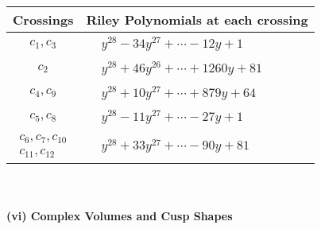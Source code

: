 \documentclass[1p]{elsarticle_modified}
\theoremstyle{definition}
\begin{document}
\begin{tabular}{m{50pt}|m{274pt}}
Crossings & \hspace{64pt}Riley Polynomials at each crossing \\
\hline $$\begin{aligned}c_{1},c_{3}\end{aligned}$$&$\begin{aligned}
&y^{28}-34 y^{27}+\cdots-12 y+1
\end{aligned}$\\
\hline $$\begin{aligned}c_{2}\end{aligned}$$&$\begin{aligned}
&y^{28}+46 y^{26}+\cdots+1260 y+81
\end{aligned}$\\
\hline $$\begin{aligned}c_{4},c_{9}\end{aligned}$$&$\begin{aligned}
&y^{28}+10 y^{27}+\cdots+879 y+64
\end{aligned}$\\
\hline $$\begin{aligned}c_{5},c_{8}\end{aligned}$$&$\begin{aligned}
&y^{28}-11 y^{27}+\cdots-27 y+1
\end{aligned}$\\
\hline $$\begin{aligned}c_{6},c_{7},c_{10}\\c_{11},c_{12}\end{aligned}$$&$\begin{aligned}
&y^{28}+33 y^{27}+\cdots-90 y+81
\end{aligned}$\\
\hline
\end{tabular}\\~\\
\newpage\flushleft \textbf{(vi) Complex Volumes and Cusp Shapes}
\end{document}
